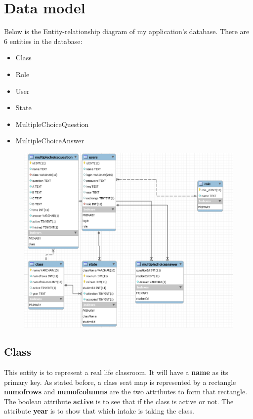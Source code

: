 \documentclass[a4paper, 11pt,openany]{book} %
\begin{document}
\section{Data model}
Below is the Entity-relationship diagram of my application's database. There are 6 entities in the database:
\begin{itemize}
    \item Class
    \item Role
    \item User
    \item State
    \item MultipleChoiceQuestion
    \item MultipleChoiceAnswer
\end{itemize}
\begin{figure}[H]
    \centering
    \includegraphics[width=\textwidth,height=\textheight,keepaspectratio]{images/erdiagram.png}
\end{figure}
\subsection{Class}
This entity is to represent a real life classroom. It will have a \textbf{name} as its primary key. As stated before, a class seat map is represented by a rectangle \textbf{numofrows} and \textbf{numofcolumns} are the two attributes to form that rectangle. The boolean attribute \textbf{active} is to see that if the class is active or not. The attribute \textbf{year} is to show that which intake is taking the class.
\end{document}
